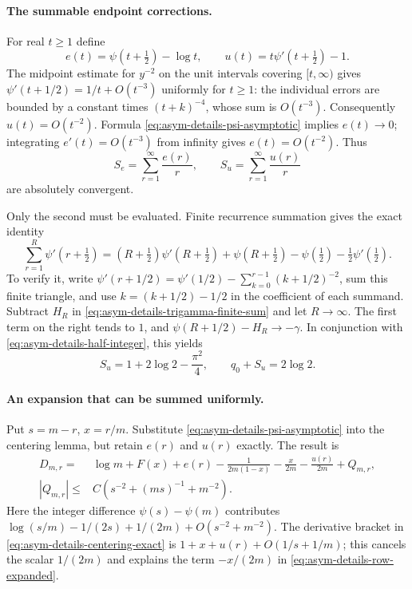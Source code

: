\paragraph{The summable endpoint corrections.}
For real $t\geq1$ define
\[
 e(t)=\psi(t+\tfrac12)-\log t,\qquad
 u(t)=t\psi'(t+\tfrac12)-1.
\]
The midpoint estimate for $y^{-2}$ on the unit intervals covering
$[t,\infty)$ gives
$\psi'(t+1/2)=1/t+O(t^{-3})$ uniformly for $t\geq1$:
the individual errors are bounded by a constant times $(t+k)^{-4}$,
whose sum is $O(t^{-3})$.  Consequently $u(t)=O(t^{-2})$.
Formula \eqref{eq:asym-details-psi-asymptotic} implies
$e(t)\to0$; integrating $e'(t)=O(t^{-3})$ from infinity gives
$e(t)=O(t^{-2})$.  Thus
\begin{equation}\label{eq:asym-details-endpoint-sums}
 S_e=\sum_{r=1}^{\infty}\frac{e(r)}r,
 \qquad S_u=\sum_{r=1}^{\infty}\frac{u(r)}r
\end{equation}
are absolutely convergent.

Only the second must be evaluated.  Finite recurrence summation gives
the exact identity
\begin{equation}\label{eq:asym-details-trigamma-finite-sum}
 \sum_{r=1}^R\psi'(r+\tfrac12)
  =(R+\tfrac12)\psi'(R+\tfrac12)+\psi(R+\tfrac12)
                         -\psi(\tfrac12)-\tfrac12\psi'(\tfrac12).
\end{equation}
To verify it, write
$\psi'(r+1/2)=\psi'(1/2)-\sum_{k=0}^{r-1}(k+1/2)^{-2}$,
sum this finite triangle, and use
$k=(k+1/2)-1/2$ in the coefficient of each summand.
Subtract $H_R$ in \eqref{eq:asym-details-trigamma-finite-sum}
and let $R\to\infty$.  The first term on the right tends to $1$,
and $\psi(R+1/2)-H_R\to-\gamma$.  In conjunction with
\eqref{eq:asym-details-half-integer}, this yields
\begin{equation}\label{eq:asym-details-Su-value}
 S_u=1+2\log2-\frac{\pi^2}{4},\qquad q_0+S_u=2\log2.
\end{equation}

\paragraph{An expansion that can be summed uniformly.}
Put $s=m-r$, $x=r/m$.  Substitute
\eqref{eq:asym-details-psi-asymptotic} into the centering lemma,
but retain $e(r)$ and $u(r)$ exactly.  The result is
\begin{align}
 D_{m,r}={}&\log m+F(x)+e(r)
       -\frac1{2m(1-x)}-\frac{x}{2m}-\frac{u(r)}{2m}
       +Q_{m,r},\label{eq:asym-details-row-expanded}\\
 |Q_{m,r}|\leq{}& C\left(s^{-2}+(ms)^{-1}+m^{-2}\right).
 \label{eq:asym-details-row-remainder}
\end{align}
Here the integer difference $\psi(s)-\psi(m)$ contributes
$\log(s/m)-1/(2s)+1/(2m)+O(s^{-2}+m^{-2})$.
The derivative bracket in \eqref{eq:asym-details-centering-exact}
is $1+x+u(r)+O(1/s+1/m)$; this cancels the scalar $1/(2m)$
and explains the term $-x/(2m)$ in
\eqref{eq:asym-details-row-expanded}.

